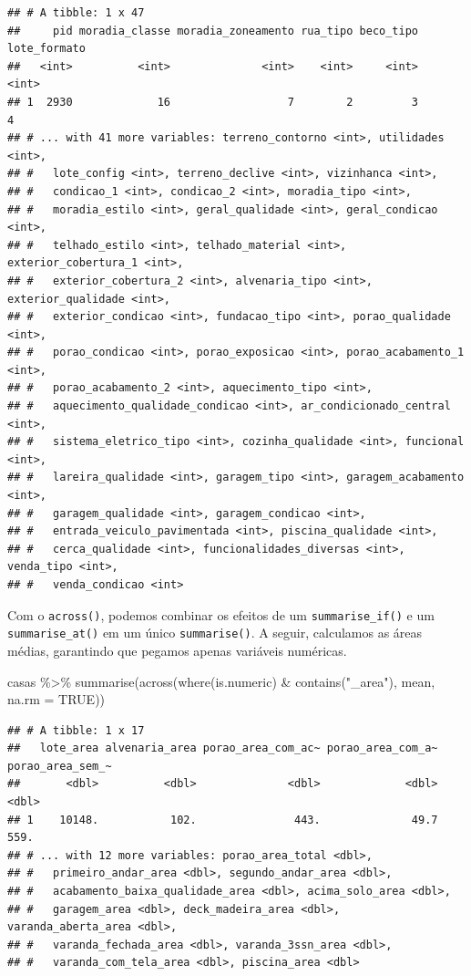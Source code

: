 \documentclass[
]{book}
\newenvironment{Shaded}{\begin{snugshade}}{\end{snugshade}}
\newcommand{\AttributeTok}[1]{\textcolor[rgb]{0.77,0.63,0.00}{#1}}
\newcommand{\ConstantTok}[1]{\textcolor[rgb]{0.00,0.00,0.00}{#1}}
\newcommand{\FunctionTok}[1]{\textcolor[rgb]{0.00,0.00,0.00}{#1}}
\newcommand{\NormalTok}[1]{#1}
\newcommand{\SpecialCharTok}[1]{\textcolor[rgb]{0.00,0.00,0.00}{#1}}
\newcommand{\StringTok}[1]{\textcolor[rgb]{0.31,0.60,0.02}{#1}}
\begin{document}
\begin{verbatim}
## # A tibble: 1 x 47
##     pid moradia_classe moradia_zoneamento rua_tipo beco_tipo lote_formato
##   <int>          <int>              <int>    <int>     <int>        <int>
## 1  2930             16                  7        2         3            4
## # ... with 41 more variables: terreno_contorno <int>, utilidades <int>,
## #   lote_config <int>, terreno_declive <int>, vizinhanca <int>,
## #   condicao_1 <int>, condicao_2 <int>, moradia_tipo <int>,
## #   moradia_estilo <int>, geral_qualidade <int>, geral_condicao <int>,
## #   telhado_estilo <int>, telhado_material <int>, exterior_cobertura_1 <int>,
## #   exterior_cobertura_2 <int>, alvenaria_tipo <int>, exterior_qualidade <int>,
## #   exterior_condicao <int>, fundacao_tipo <int>, porao_qualidade <int>,
## #   porao_condicao <int>, porao_exposicao <int>, porao_acabamento_1 <int>,
## #   porao_acabamento_2 <int>, aquecimento_tipo <int>,
## #   aquecimento_qualidade_condicao <int>, ar_condicionado_central <int>,
## #   sistema_eletrico_tipo <int>, cozinha_qualidade <int>, funcional <int>,
## #   lareira_qualidade <int>, garagem_tipo <int>, garagem_acabamento <int>,
## #   garagem_qualidade <int>, garagem_condicao <int>,
## #   entrada_veiculo_pavimentada <int>, piscina_qualidade <int>,
## #   cerca_qualidade <int>, funcionalidades_diversas <int>, venda_tipo <int>,
## #   venda_condicao <int>
\end{verbatim}

Com o \texttt{across()}, podemos combinar os efeitos de um \texttt{summarise\_if()} e um \texttt{summarise\_at()} em um único \texttt{summarise()}. A seguir, calculamos as áreas médias, garantindo que pegamos apenas variáveis numéricas.

\begin{Shaded}
\begin{Highlighting}[]
\NormalTok{casas }\SpecialCharTok{\%\textgreater{}\%}
  \FunctionTok{summarise}\NormalTok{(}\FunctionTok{across}\NormalTok{(}\FunctionTok{where}\NormalTok{(is.numeric) }\SpecialCharTok{\&} \FunctionTok{contains}\NormalTok{(}\StringTok{"\_area"}\NormalTok{), mean, }\AttributeTok{na.rm =} \ConstantTok{TRUE}\NormalTok{))}
\end{Highlighting}
\end{Shaded}

\begin{verbatim}
## # A tibble: 1 x 17
##   lote_area alvenaria_area porao_area_com_ac~ porao_area_com_a~ porao_area_sem_~
##       <dbl>          <dbl>              <dbl>             <dbl>            <dbl>
## 1    10148.           102.               443.              49.7             559.
## # ... with 12 more variables: porao_area_total <dbl>,
## #   primeiro_andar_area <dbl>, segundo_andar_area <dbl>,
## #   acabamento_baixa_qualidade_area <dbl>, acima_solo_area <dbl>,
## #   garagem_area <dbl>, deck_madeira_area <dbl>, varanda_aberta_area <dbl>,
## #   varanda_fechada_area <dbl>, varanda_3ssn_area <dbl>,
## #   varanda_com_tela_area <dbl>, piscina_area <dbl>
\end{verbatim}
\end{document}
